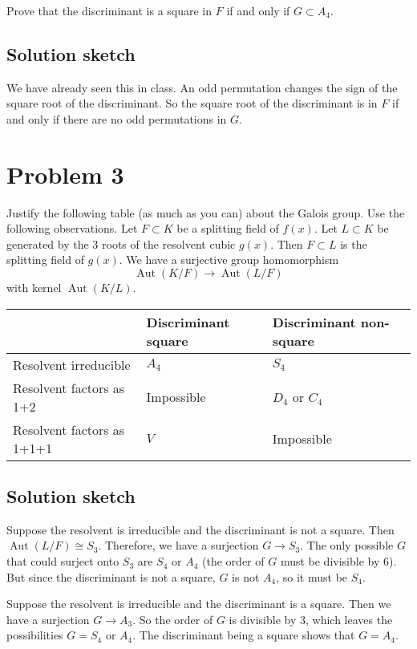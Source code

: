 \documentclass[12pt]{amsart}
\begin{document}
Prove that the discriminant is a square in \(F\) if and only if \(G \subset A_4\).
\subsection{Solution sketch}
\label{sec:org8b3d37c}
We have already seen this in class.
An odd permutation changes the sign of the square root of the discriminant.
So the square root of the discriminant is in \(F\) if and only if there are no odd permutations in \(G\).
\section{Problem 3}
\label{sec:org4fc6139}

Justify the following table (as much as you can) about the Galois group.
Use the following observations.
Let \(F \subset K\) be a splitting field of \(f(x)\).
Let \(L \subset K\) be generated by the 3 roots of the resolvent cubic \(g(x)\).
Then \(F \subset L\) is the splitting field of \(g(x)\).
We have a surjective group homomorphism
\[ \operatorname{Aut}(K/F) \to \operatorname{Aut}(L/F)\]
with kernel \(\operatorname{Aut}(K/L)\).


\begin{center}
\begin{tabular}{lll}
 & Discriminant square & Discriminant non-square\\
\hline
Resolvent irreducible & \(A_4\) & \(S_4\)\\
Resolvent factors as 1+2 & Impossible & \(D_4\) or \(C_4\)\\
Resolvent factors as 1+1+1 & \(V\) & Impossible\\
\hline
\end{tabular}
\end{center}
\subsection{Solution sketch}
\label{sec:orgf6a19b3}

Suppose the resolvent is irreducible and the discriminant is not a square.
Then \(\operatorname{Aut}(L/F) \cong S_3\).
Therefore, we have a surjection \(G \to S_3\).
The only possible \(G\) that could surject onto \(S_3\) are \(S_4\) or \(A_4\) (the order of \(G\) must be divisible by 6).
But since the discriminant is not a square, \(G\) is not \(A_4\), so it must be \(S_4\).

Suppose the resolvent is irreducible and the discriminant is a square.
Then we have a surjection \(G \to A_3\).
So the order of \(G\) is divisible by 3, which leaves the possibilities \(G = S_4\) or \(A_4\).
The discriminant being a square shows that \(G = A_4\).
\end{document}
